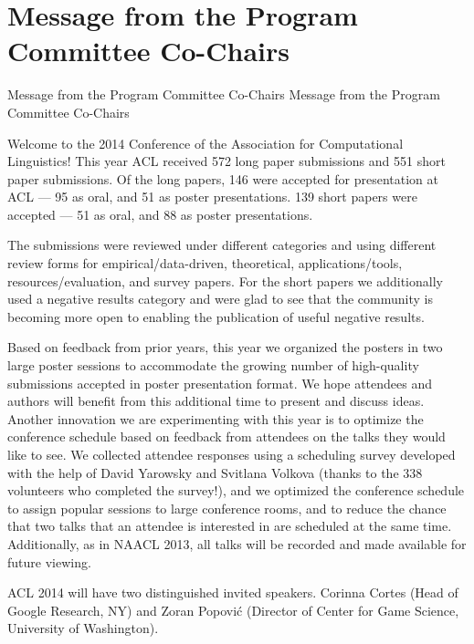 \section{Message from the Program Committee Co-Chairs}
\setheaders%
    {Message from the Program Committee Co-Chairs}%
    {Message from the Program Committee Co-Chairs}
\thispagestyle{emptyheader}

\setlength{\parskip}{.7ex}

Welcome to the 2014 Conference of the Association for Computational
Linguistics! This year ACL received 572 long paper submissions and 551
short paper submissions. Of the long papers, 146 were accepted for
presentation at ACL --- 95 as oral, and 51 as poster
presentations. 139 short papers were accepted --- 51 as oral, and 88
as poster presentations.

The submissions were reviewed under different categories and using
different review forms for empirical/data-driven, theoretical,
applications/tools, resources/evaluation, and survey papers. For the
short papers we additionally used a negative results category and were
glad to see that the community is becoming more open to enabling the
publication of useful negative results.

Based on feedback from prior years, this year we organized the posters
in two large poster sessions to accommodate the growing number of
high-quality submissions accepted in poster presentation format. We
hope attendees and authors will benefit from this additional time to
present and discuss ideas.  Another innovation we are experimenting
with this year is to optimize the conference schedule based on
feedback from attendees on the talks they would like to see. We
collected attendee responses using a scheduling survey developed with
the help of David Yarowsky and Svitlana Volkova (thanks to the 338
volunteers who completed the survey!), and we optimized the conference
schedule to assign popular sessions to large conference rooms, and to
reduce the chance that two talks that an attendee is interested in are
scheduled at the same time.  Additionally, as in NAACL 2013, all talks
will be recorded and made available for future viewing.

ACL 2014 will have two distinguished invited speakers. Corinna Cortes
(Head of Google Research, NY) and Zoran Popovi\'{c} (Director of
Center for Game Science, University of Washington).

